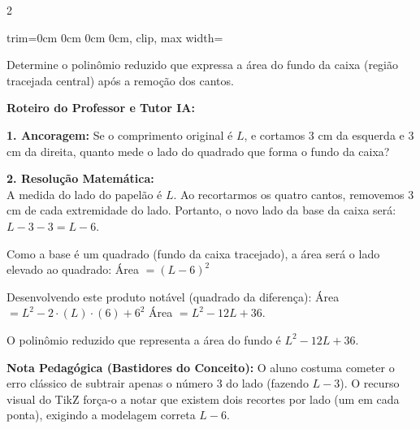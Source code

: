 \begin{multicols*}{2}
\begin{enunciadoLiteral}
\begin{center}
\begin{adjustbox}{trim=0cm 0cm 0cm 0cm, clip, max width=\larguraTikz}
\begin{tikzpicture}
\end{tikzpicture}
\end{adjustbox}
\end{center}

Determine o polinômio reduzido que expressa a área do fundo da caixa (região tracejada central) após a remoção dos cantos.
\end{enunciadoLiteral}

\ifgabarito
    \begin{tcolorbox}[colback=CorTitUm!5, colframe=CorTitUm, boxrule=1pt, arc=4pt, left=6pt, right=6pt, top=6pt, bottom=6pt]
    \small\textbf{\textcolor{CorTitUm}{Roteiro do Professor e Tutor IA:}}\par\vspace{0.1cm}
    \color{CinzaEscuro}
    \textbf{1. Ancoragem:} Se o comprimento original é $L$, e cortamos 3 cm da esquerda e 3 cm da direita, quanto mede o lado do quadrado que forma o fundo da caixa?\par\vspace{0.1cm}
    \textbf{2. Resolução Matemática:}\\
    A medida do lado do papelão é $ L $.
    Ao recortarmos os quatro cantos, removemos 3 cm de cada extremidade do lado. 
    Portanto, o novo lado da base da caixa será: $ L - 3 - 3 = L - 6 $.
    
    Como a base é um quadrado (fundo da caixa tracejado), a área será o lado elevado ao quadrado:
    Área $ = (L - 6)^2 $
    
    Desenvolvendo este produto notável (quadrado da diferença):
    Área $ = L^2 - 2 \cdot (L) \cdot (6) + 6^2 $
    Área $ = L^2 - 12L + 36 $.
    
    O polinômio reduzido que representa a área do fundo é \textbf{$ L^2 - 12L + 36 $}.
    \end{tcolorbox}
    \vspace{0.15cm}
    
    \begin{boxexplicacao}
    \textbf{Nota Pedagógica (Bastidores do Conceito):} O aluno costuma cometer o erro clássico de subtrair apenas o número 3 do lado (fazendo $L - 3$). O recurso visual do TikZ força-o a notar que existem dois recortes por lado (um em cada ponta), exigindo a modelagem correta $L - 6$.
    \end{boxexplicacao}
\fi

\par\vspace{\espacoQuestao}


\end{multicols*}
